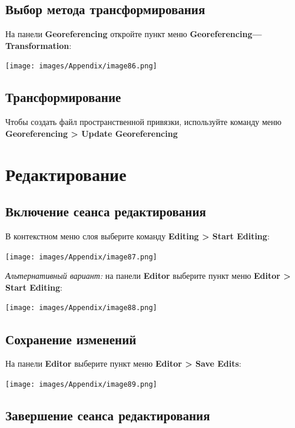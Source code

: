 \documentclass[12pt,]{book}
\begin{document}
\hypertarget{section-45}{%
\section{Выбор метода трансформирования}\label{section-45}}

На панели \textbf{Georeferencing} откройте пункт меню \textbf{Georeferencing---Transformation}:

\texttt{[image: images/Appendix/image86.png]}

\hypertarget{section-46}{%
\section{Трансформирование}\label{section-46}}

Чтобы создать файл пространственной привязки, используйте команду меню \textbf{Georeferencing \textgreater{} Update Georeferencing}

\hypertarget{manual-edit}{%
\chapter{Редактирование}\label{manual-edit}}

\hypertarget{manual-edit-begin}{%
\section{Включение сеанса редактирования}\label{manual-edit-begin}}

В контекстном меню слоя выберите команду \textbf{Editing \textgreater{} Start Editing}:

\texttt{[image: images/Appendix/image87.png]}

\emph{Альтернативный вариант:} на панели \textbf{Editor} выберите пункт меню \textbf{Editor \textgreater{} Start Editing}:

\texttt{[image: images/Appendix/image88.png]}

\hypertarget{manual-edit-save}{%
\section{Сохранение изменений}\label{manual-edit-save}}

На панели \textbf{Editor} выберите пункт меню \textbf{Editor \textgreater{} Save Edits}:

\texttt{[image: images/Appendix/image89.png]}

\hypertarget{manual-edit-end}{%
\section{Завершение сеанса редактирования}\label{manual-edit-end}}
\end{document}
